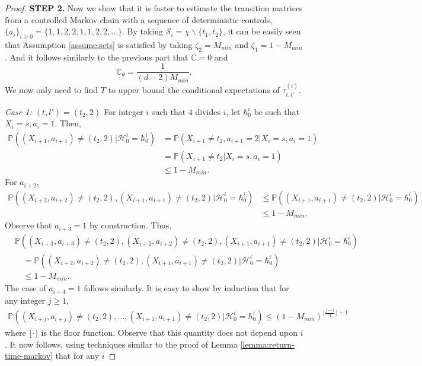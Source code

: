 \documentclass[opre,sglanonrev]{informs4}
\numberwithin{equation}{section}
\newcommand{\pow}[1]{^{(#1)}}
\newcommand{\lp}{\left(}
\newcommand{\rp}{\right)}
\newcommand{\History}{\mathcal{H}}
\newcommand{\history}{\hbar}
\newcommand{\Cbb}{\mathbb{C}}
\newcommand{\Pbb}{\mathbb{P}}
\newcommand{\Scal}{\mathcal{S}}
\newcommand{\constant}{\Cbb}
\newcommand{\prob}{\Pbb}
\begin{document}
\begin{APPENDICES}
\begin{proof}
\textbf{STEP 2.}
Now we show that it is faster to estimate the transition matrices from a controlled Markov chain with a sequence of deterministic controls, $\{a_i\}_{i\geq 0}=\{1,1,2,2,1,1,2,2,\dots \}$. By taking $\Scal_i = \chi\backslash\{t_1,t_2\}$, it can be easily seen that Assumption \ref{assume:sets} is satisfied by taking $\zeta_2 = M_{min}$ and $\zeta_1 = 1-M_{min}$. And it follows similarly to the previous part that $\constant = 0$ and 
\[
\constant_\theta  = \frac{1}{(d-2)M_{min}}.
\]
We now only need to find $T$ to upper bound the conditional expectations of $\tau_{t,l'}\pow i$.

\emph{Case 1: $(t,l')=(t_2,2)$} For integer $i$ such that $4$ divides $i$, let $\history_0^i$ be such that $X_i=s,a_i=1$. Then, 
\begin{align*}
    \prob\lp (X_{i+1},a_{i+1})\neq (t_2, 2)|\History_0^i = \history_0^i\rp & =  \prob\lp X_{i+1}\neq t_2,a_{i+1} = 2|X_i=s,a_i=1\rp\\
    & =  \prob\lp X_{i+1}\neq t_2|X_i=s,a_i=1\rp\\
    & \leq 1-M_{min}.
\end{align*}
For $a_{i+2}$,
\begin{align*}
    \prob\lp (X_{i+2},a_{i+2})\neq (t_2,2), (X_{i+1},a_{i+1})\neq (t_2,2)|\History_0^i = \history_0^i\rp & \leq\prob\lp  (X_{i+1},a_{i+1})\neq (t_2,2)|\History_0^i = \history_0^i\rp\\
    & \leq 1-M_{min}.
\end{align*}
Observe that $a_{i+3}=1$ by construction. Thus,
\begin{align*}
    & \prob\lp (X_{i+3},a_{i+3})\neq (t_2,2), (X_{i+2},a_{i+2})\neq (t_2,2), (X_{i+1},a_{i+1})\neq (t_2,2)|\History_0^i = \history_0^i\rp\\
     & \quad =  \prob\lp (X_{i+2},a_{i+2})\neq (t_2,2), (X_{i+1},a_{i+1})\neq (t_2,2)|\History_0^i = \history_0^i\rp\\
    & \quad  \leq 1-M_{min}.
\end{align*}
The case of $a_{i+4}=1$ follows similarly. It is easy to show by induction that for any integer $j\geq 1$,
\begin{align*}
    \prob\lp (X_{i+j},a_{i+j})\neq (t_2,2),\dots, (X_{i+1},a_{i+1})\neq (t_2,2)|\History_0^i = \history_0^i\rp\leq (1-M_{min})^{\lfloor\frac{j-1}{4}\rfloor+1}
\end{align*}
where $\lfloor\cdot\rfloor$ is the floor function. Observe that this quantity does not depend upon $i$. It now follows, using techniques similar to the proof of Lemma \ref{lemma:return-time-markov} that for any $i$ 

\end{proof}
\end{APPENDICES}
\end{document}
